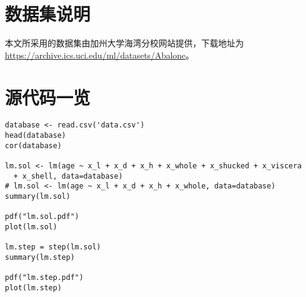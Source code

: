 \section{数据集说明}

本文所采用的数据集由加州大学海湾分校网站提供，下载地址为 \url{https://archive.ics.uci.edu/ml/datasets/Abalone}。

\section{源代码一览}

\begin{verbatim}
database <- read.csv('data.csv')
head(database)
cor(database)

lm.sol <- lm(age ~ x_l + x_d + x_h + x_whole + x_shucked + x_viscera
  + x_shell, data=database)
# lm.sol <- lm(age ~ x_l + x_d + x_h + x_whole, data=database)
summary(lm.sol)

pdf("lm.sol.pdf")
plot(lm.sol)

lm.step = step(lm.sol)
summary(lm.step)

pdf("lm.step.pdf")
plot(lm.step)
\end{verbatim}

